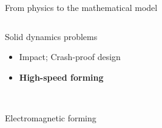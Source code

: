 \begin{withoutheadline}
\begin{frame}{From physics to the mathematical model}
\begin{overprint}
    \begin{columns}
      \begin{column}{0.45\textwidth}
        \begin{block}{Solid dynamics problems}
          \begin{itemize}
          \item[] Impact; Crash-proof design
          \item[] \textbf{High-speed forming}
          \end{itemize}
        \end{block}
      \end{column}
      
      \begin{column}{0.55\textwidth}
      \end{column}
    \end{columns}
    \centering
      \\
    \scriptsize Electromagnetic forming \cite{Guillaume}
    
      



\end{overprint}
\end{frame}
\end{withoutheadline}
